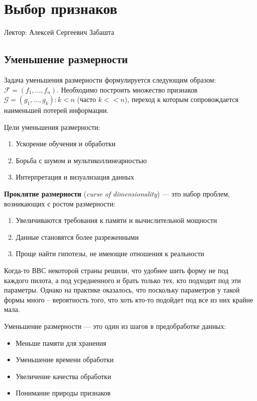 \chapter{Выбор признаков}

Лектор: Алексей Сергеевич Забашта

\section{Уменьшение размерности}

\begin{definition}
    Задача уменьшения размерности формулируется следующим образом: $\mathcal{F}=(f_1,...,f_n)$. Необходимо построить множество признаков $\mathcal{G}=(g_1,...,g_k):k<n$ (часто $k<<n$), переход к которым сопровождается наименьшей потерей информации.
\end{definition}

Цели уменьшения размерности:
\begin{enumerate}
    \item Ускорение обучения и обработки
    \item Борьба с шумом и мультиколлинеарностью
    \item Интерпретация и визуализация данных
\end{enumerate}

\begin{definition}
    \textbf{Проклятие размерности} (\textit{curse of dimensionality}) --- это набор проблем, возникающих с ростом размерности:
    \begin{enumerate}
        \item Увеличиваются требования к памяти и вычислительной мощности
        \item Данные становятся более разреженными
        \item Проще найти гипотезы, не имеющие отношения к реальности
    \end{enumerate}
\end{definition}

\begin{example}
    Когда-то ВВС некоторой страны решили, что удобнее шить форму не под каждого пилота, а под усредненного и брать только тех, кто подходит под эти параметры. Однако на практике оказалось, что поскольку параметров у такой формы много -- вероятность того, что хоть кто-то подойдет под все из них крайне мала.
\end{example}

Уменьшение размерности --- это один из шагов в предобработке данных:
\begin{itemize}
    \item Меньше памяти для хранения
    \item Уменьшение времени обработки
    \item Увеличение качества обработки
    \item Понимание природы признаков
\end{itemize}

